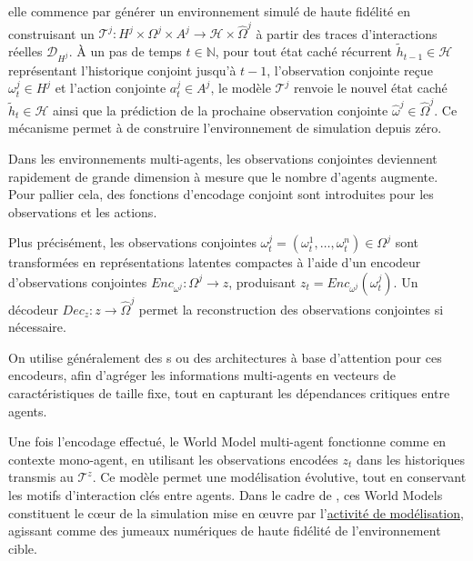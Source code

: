 elle commence par générer un environnement simulé de haute fidélité en construisant un  $\mathcal{T}^j : H^j \times \Omega^j \times A^j \rightarrow \mathcal{H} \times \hat{\Omega}^j$ à partir des traces d'interactions réelles $\mathcal{D}_{H^j}$. À un pas de temps $t \in \mathbb{N}$, pour tout état caché récurrent $\tilde{h}_{t-1} \in \mathcal{H}$ représentant l'historique conjoint jusqu'à $t-1$, l'observation conjointe reçue $\omega_t^j \in H^j$ et l'action conjointe $a_t^j \in A^j$, le modèle $\mathcal{T}^j$ renvoie le nouvel état caché $\tilde{h}_t \in \mathcal{H}$ ainsi que la prédiction de la prochaine observation conjointe $\hat{\omega}^j \in \hat{\Omega}^j$. Ce mécanisme permet à  de construire l'environnement de simulation depuis zéro.

Dans les environnements multi-agents, les observations conjointes deviennent rapidement de grande dimension à mesure que le nombre d'agents augmente. Pour pallier cela, des fonctions d'encodage conjoint sont introduites pour les observations et les actions.

Plus précisément, les observations conjointes $\omega_t^{j} = (\omega_t^1, \dots, \omega_t^n) \in \Omega^{j}$ sont transformées en représentations latentes compactes à l'aide d'un encodeur d'observations conjointes $Enc_{\omega^j} : \Omega^j \rightarrow z$, produisant $z_t = Enc_{\omega^j}(\omega_t^j)$. Un décodeur $Dec_z : z \rightarrow \hat{\Omega}^j$ permet la reconstruction des observations conjointes si nécessaire.

On utilise généralement des s ou des architectures à base d'attention pour ces encodeurs, afin d'agréger les informations multi-agents en vecteurs de caractéristiques de taille fixe, tout en capturant les dépendances critiques entre agents.

Une fois l'encodage effectué, le World Model multi-agent fonctionne comme en contexte mono-agent, en utilisant les observations encodées $z_t$ dans les historiques transmis au  $\mathcal{T}^{z}$. Ce modèle permet une modélisation évolutive, tout en conservant les motifs d'interaction clés entre agents. Dans le cadre de , ces World Models constituent le cœur de la simulation mise en œuvre par l'\hyperref[sec:modelling]{activité de modélisation}, agissant comme des jumeaux numériques de haute fidélité de l'environnement cible.

